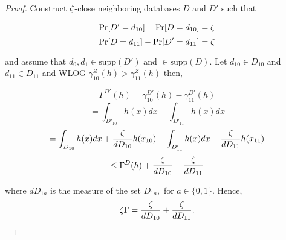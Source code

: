 \begin{proof}
Construct $\zeta$-close neighboring databases $D$ and $D'$ such that

$$\Pr[D'=d_{10}] - \Pr[D=d_{10}] = \zeta$$
$$\Pr[D=d_{11}] - \Pr[D'=d_{11}] = \zeta$$



and assume that $d_0, d_1 \in \text{supp}(D')$ and $\in \text{supp}(D)$. Let $d_{10} \in D_{10}$ and $d_{11} \in D_{11}$ and WLOG $\gamma_{10}^Z(h) > \gamma_{11}^Z(h)$ then,

$$\Gamma^{D'}(h) = \gamma_{10}^{D'}(h) - \gamma_{11}^{D'}(h)$$
$$= \int_{D'_{10}}h(x)dx - \int_{D'_{11}}h(x)dx$$
$$= \int_{D_{10}}h(x)dx + \frac{\zeta}{dD_{10}}h(x_{10}) - \int_{D'_{11}}h(x)dx - \frac{\zeta}{dD_{11}}h(x_{11})$$
$$\leq \Gamma^{D}(h) + \frac{\zeta}{dD_{10}} + \frac{\zeta}{dD_{11}}$$

where $dD_{1a}$ is the measure of the set $D_{1a},$ for $a \in \{0,1\}$. Hence,
$$\zeta\Gamma = \frac{\zeta}{dD_{10}} + \frac{\zeta}{dD_{11}}.$$
\end{proof}

